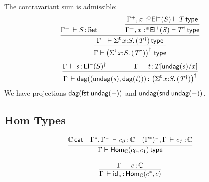 \documentclass[11pt]{article}
\theoremstyle{plain}
\begin{document}

The contravariant sum is admissible:
\begin{equation}
	\infer{
		\wftp{ \Gamma }{ \paren{\sigmatp{x}{S}{(T^\dagger)}}^\dagger }
	}{
		\infer{
			\wftp{ \Gamma^- }{ \sigmatp{x}{S}{(T^\dagger)} }
		}{
			\ofdtp{ \Gamma^- }{ S }{ \types }
			\qquad \qquad
			\infer{
				\wftp{\Gamma^-, \tptmv{x}{\coc}{\Elp S}}{T^\dagger}
			}{
				\wftp{\Gamma^+, \tptmv{x}{\conc}{\Elp S}}{T}
			}
		}	
	}
\end{equation}
\begin{equation}
	\infer{
		\oftp{\Gamma}{\dagtm{(\undag s, \dagtm t)}}{ \paren{\sigmatp{x}{S}{(T^\dagger)}}^\dagger }
	}{
		\oftp{\Gamma}{s}{\Elp S^\dagger}
		\qquad \qquad
		\oftp{\Gamma}{t}{\subst T {\undag s} x}
	}
\end{equation}
We have projections $\mathsf{dag}(\mathit{\mathsf{fst}_{} \: \mathsf{undag}(-)})$ and $\mathsf{undag}(\mathit{\mathsf{snd}_{} \: \mathsf{undag}(-)})$.

\subsection{Hom Types}

\[
\begin{array}{c}
\infer{\wftp{\Gamma}{\Hom{\C}{c_0}{c_1}}}
      {\wfdtp{\C} &
        \oftp{\Gamma^*,\Gamma^\con}{c_0}{\C} & 
        \oftp{(\Gamma^*)^\con,\Gamma}{c_1}{\C} 
      }
\\ \\
\infer{\oftp{\Gamma}{\idm{c}}{\Hom{\C}{c^*}{c}}}
      {\oftp{\Gamma}{c}{\C}
      }
\end{array}
\]

\end{document}
